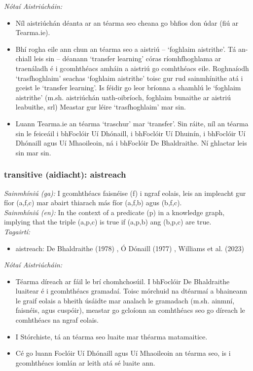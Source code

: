  \noindent \textit{Nótaí Aistriúcháin:}
\begin{itemize}
	\item Níl aistriúchán déanta ar an téarma seo cheana go bhfios don údar (fiú ar Tearma.ie).
	\item Bhí rogha eile ann chun an téarma seo a aistriú -- `foghlaim aistrithe'. Tá an-chiall leis sin -- déanann `transfer learning' córas ríomhfhoghlama ar traenáladh é i gcomhthéacs amháin a aistriú go comhthéacs eile. Roghnaíodh `trasfhoghlaim' seachas `foghlaim aistrithe' toisc gur rud sainmhínithe atá i gceist le `transfer learning'. Is féidir go leor bríonna a shamhlú le `foghlaim aistrithe' (m.sh. aistriúchán uath-oibríoch, foghlaim bunaithe ar aistriú leabuithe, srl) Meastar gur léire `trasfhoghlaim' mar sin.
	\item Luann Tearma.ie an téarma `traschur' mar `transfer'. Sin ráite, níl an téarma sin le feiceáil i bhFoclóir Uí Dhónaill, i bhFoclóir Uí Dhuinín, i bhFoclóir Uí Dhónaill agus Uí Mhaoileoin, ná i bhFoclóir De Bhaldraithe. Ní ghlactar leis sin mar sin.
\end{itemize}


\subsubsection*{transitive (aidiacht): aistreach}
 \noindent \textit{Sainmhíniú (ga):} I gcomhthéacs faisnéise (f) i ngraf eolais, leis an impleacht gur fíor (a,f,c) mar abairt thiarach más fíor (a,f,b) agus (b,f,c).
\\
 \noindent \textit{Sainmhíniú (en):} In the context of a predicate (p) in a knowledge graph, implying that the triple (a,p,c) is true if (a,p,b) ang (b,p,c) are true.
\\
 \noindent \textit{Tagairtí:}
\begin{itemize}
	\item aistreach: De Bhaldraithe (1978) \cite{de-bhaldraithe}, Ó Dónaill (1977) \cite{odonaill}, Williams et al. (2023) \cite{storchiste}
\end{itemize}

 \noindent \textit{Nótaí Aistriúcháin:}
\begin{itemize}
	\item Téarma díreach ar fáil le brí chomhchosúil. I bhFoclóir De Bhaldraithe luaitear é i gcomhthéacs gramadaí. Toisc mórchuid na dtéarmaí a bhaineann le graif eolais a bheith úsáidte mar analach le gramadach (m.sh. ainmní, faisnéis, agus cuspóir), meastar go gcloíonn an comhthéacs seo go díreach le comhthéacs na ngraf eolais.
	\item I Stórchiste, tá an téarma seo luaite mar théarma matamaitice.
	\item Cé go luann Foclóir Uí Dhónaill agus Uí Mhaoileoin an téarma seo, is i gcomhthéacs iomlán ar leith atá sé luaite ann.
\end{itemize}


